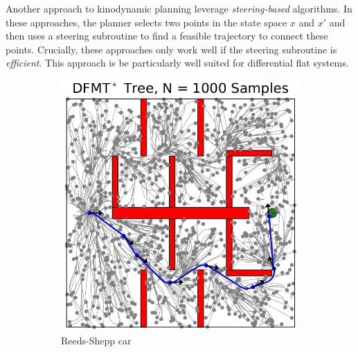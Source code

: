 Another approach to kinodynamic planning leverage \textit{steering-based} algorithms. In these approaches, the planner selects two points in the state space $x$ and $x'$ and then uses a steering subroutine to find a feasible trajectory to connect these points. Crucially, these approaches only work well if the steering subroutine is \textit{efficient}. This approach is be particularly well suited for differential flat systems.

\begin{figure}[ht]
    \centering
    \begin{subfigure}[b]{0.4\linewidth}
      \includegraphics[width=\linewidth]{tex/figs/ch07_figs/driftless.png}
      \caption{Reeds-Shepp car}
    \end{subfigure}
    \begin{subfigure}[b]{0.4\linewidth}

\end{subfigure}
\end{figure}
